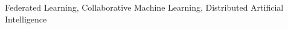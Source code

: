 \documentclass[journal]{IEEEtran}
\begin{document}
\begin{IEEEkeywords}
Federated Learning, Collaborative Machine Learning, Distributed Artificial Intelligence
\end{IEEEkeywords}














\begin{comment}
{\appendix[Proof of the Zonklar Equations]
Use $\backslash${\tt{appendix}} if you have a single appendix:
Do not use $\backslash${\tt{section}} anymore after $\backslash${\tt{appendix}}, only $\backslash${\tt{section*}}.
If you have multiple appendixes use $\backslash${\tt{appendices}} then use $\backslash${\tt{section}} to start each appendix.
You must declare a $\backslash${\tt{section}} before using any $\backslash${\tt{subsection}} or using $\backslash${\tt{label}} ($\backslash${\tt{appendices}} by itself
starts a section numbered zero.)}


\end{comment}



\end{document}
